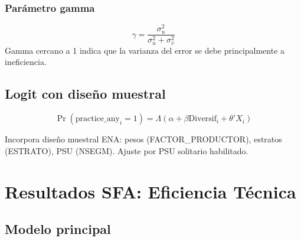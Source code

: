 \documentclass[11pt,a4paper]{article}
\begin{document}
\subsubsection{Parámetro gamma}
\[
\gamma = \frac{\sigma_u^2}{\sigma_u^2 + \sigma_v^2}
\]
Gamma cercano a 1 indica que la varianza del error se debe principalmente a ineficiencia.

\subsection{Logit con diseño muestral}
\[
\Pr(\text{practice\_any}_i = 1) = \Lambda(\alpha + \beta \text{Diversif}_i + \theta' X_i)
\]

Incorpora diseño muestral ENA: pesos (FACTOR\_PRODUCTOR), estratos (ESTRATO), PSU (NSEGM). Ajuste por PSU solitario habilitado.

\section{Resultados SFA: Eficiencia Técnica}

\subsection{Modelo principal}
\end{document}
